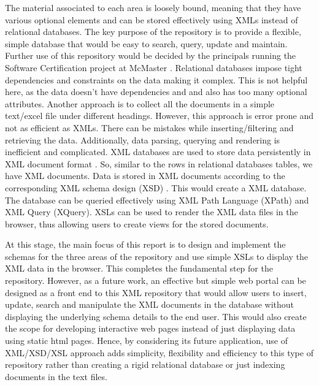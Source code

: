 \documentclass[11pt,letterpaper]{report}
\begin{document}
The material associated to each area is loosely bound, meaning that they have various optional elements and can be stored effectively using XMLs instead of relational databases. The key purpose of the repository is to provide a flexible, simple database that would be easy to search, query, update and maintain. Further use of this repository would be decided by the principals running the Software Certification project at McMaster \cite{McCert}. Relational databases impose tight dependencies and constraints on the data making it complex. This is not helpful here, as the data doesn't have dependencies and and also has too many optional attributes. Another approach is to collect all the documents in a simple text/excel file under different headings. However, this approach is error prone and not as efficient as XMLs. There can be mistakes while inserting/filtering and retrieving the data. Additionally, data parsing, querying and rendering is inefficient and complicated. XML databases are used to store data persistently in XML document format \cite{XMLDB}. So, similar to the rows in relational databases tables, we have XML documents. Data is stored in XML documents according to the corresponding XML schema design (XSD) \cite{XSD}. This would create a XML database. The database can be queried effectively using XML Path Language (XPath) \cite{XPath} and XML Query (XQuery)\cite{XQuery}. XSLs can be used to render the XML data files in the browser, thus allowing users to create views for the stored documents. 

At this stage, the main focus of this report is to design and implement the schemas for the three areas of the repository and use simple XSLs to display the XML data in the browser. This completes the fundamental step for the repository. However, as a future work, an effective but simple web portal can be designed as a front end to this XML repository that would allow users to insert, update, search and manipulate the XML documents in the database without displaying the underlying schema details to the end user. This would also create the scope for developing interactive web pages instead of just displaying data using static html pages.  Hence, by considering its future application, use of XML/XSD/XSL approach adds simplicity, flexibility and efficiency to this type of repository rather than creating a rigid relational database or just indexing documents in the text files.     
\end{document}
